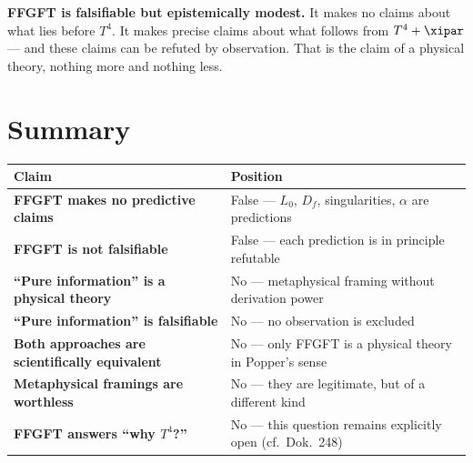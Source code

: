\begin{erkenntnis}
\textbf{FFGFT is falsifiable but epistemically modest.} It makes no claims about what lies before $T^4$. It makes precise claims about what follows from $T^4 + \xipar$ --- and these claims can be refuted by observation. That is the claim of a physical theory, nothing more and nothing less.
\end{erkenntnis}

\section*{Summary}

\begin{longtable}{>{\bfseries}p{7.2cm} p{7.2cm}}
\toprule
Claim & Position \\
\midrule
FFGFT makes no predictive claims & False --- $L_0$, $D_f$, singularities, $\alpha$ are predictions \\
FFGFT is not falsifiable & False --- each prediction is in principle refutable \\
``Pure information'' is a physical theory & No --- metaphysical framing without derivation power \\
``Pure information'' is falsifiable & No --- no observation is excluded \\
Both approaches are scientifically equivalent & No --- only FFGFT is a physical theory in Popper's sense \\
Metaphysical framings are worthless & No --- they are legitimate, but of a different kind \\
FFGFT answers ``why $T^4$?'' & No --- this question remains explicitly open (cf.\ Dok.~248) \\
\bottomrule
\end{longtable}

